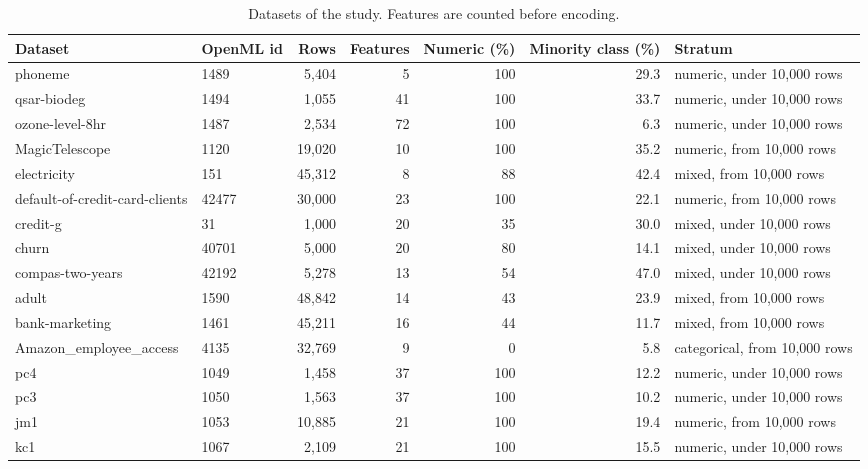 \begin{table}[t]
\centering
\caption{Datasets of the study. Features are counted before encoding.}
\label{tab:datasets}
\small
\begin{tabular}{llrrrrl}
\toprule
Dataset & OpenML id & Rows & Features & Numeric (\%) & Minority class (\%) & Stratum \\
\midrule
phoneme & 1489 & 5,404 & 5 & 100 & 29.3 & numeric, under 10,000 rows \\
qsar-biodeg & 1494 & 1,055 & 41 & 100 & 33.7 & numeric, under 10,000 rows \\
ozone-level-8hr & 1487 & 2,534 & 72 & 100 & 6.3 & numeric, under 10,000 rows \\
MagicTelescope & 1120 & 19,020 & 10 & 100 & 35.2 & numeric, from 10,000 rows \\
electricity & 151 & 45,312 & 8 & 88 & 42.4 & mixed, from 10,000 rows \\
default-of-credit-card-clients & 42477 & 30,000 & 23 & 100 & 22.1 & numeric, from 10,000 rows \\
credit-g & 31 & 1,000 & 20 & 35 & 30.0 & mixed, under 10,000 rows \\
churn & 40701 & 5,000 & 20 & 80 & 14.1 & mixed, under 10,000 rows \\
compas-two-years & 42192 & 5,278 & 13 & 54 & 47.0 & mixed, under 10,000 rows \\
adult & 1590 & 48,842 & 14 & 43 & 23.9 & mixed, from 10,000 rows \\
bank-marketing & 1461 & 45,211 & 16 & 44 & 11.7 & mixed, from 10,000 rows \\
Amazon\_employee\_access & 4135 & 32,769 & 9 & 0 & 5.8 & categorical, from 10,000 rows \\
pc4 & 1049 & 1,458 & 37 & 100 & 12.2 & numeric, under 10,000 rows \\
pc3 & 1050 & 1,563 & 37 & 100 & 10.2 & numeric, under 10,000 rows \\
jm1 & 1053 & 10,885 & 21 & 100 & 19.4 & numeric, from 10,000 rows \\
kc1 & 1067 & 2,109 & 21 & 100 & 15.5 & numeric, under 10,000 rows \\
\bottomrule
\end{tabular}
\end{table}
